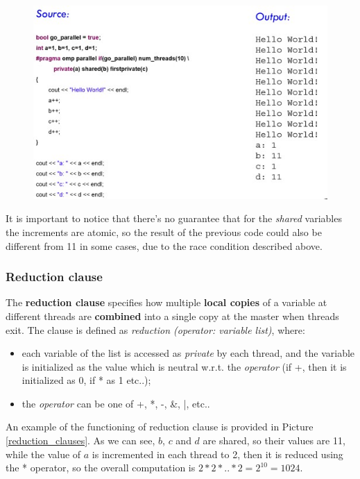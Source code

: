 \begin{figure}[h!]
		\centering
		\includegraphics[scale = 1.6]{img/variable sharing clauses.jpg}
        \label{variable_sharing}
\end{figure}

It is important to notice that there's no guarantee that for the \textit{shared} variables the increments are atomic, so the result of the previous code could also be different from 11 in some cases, due to the race condition described above.

\subsubsection{Reduction clause}
The \textbf{reduction clause} specifies how multiple \textbf{local copies} of a variable at different threads are \textbf{combined} into a single copy at the master when threads exit. The clause is defined as \textit{reduction (operator: variable list)}, where:

\begin{itemize}
    \item each variable of the list is accessed as \textit{private} by each thread, and the variable is initialized as the value which is neutral w.r.t. the \textit{operator} (if +, then it is initialized as 0, if * as 1 etc..);
    \item the \textit{operator} can be one of +, *, -, &, |, etc..
\end{itemize}

An example of the functioning of reduction clause is provided in Picture \ref{reduction_clauses}. As we can see, $b$, $c$ and $d$ are shared, so their values are 11, while the value of $a$ is incremented in each thread to 2, then it is reduced using the * operator, so the overall computation is $2*2*..*2 = 2^{10} = 1024$.


